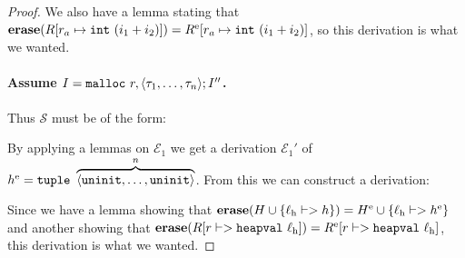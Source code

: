 \begin{proof}
  We also have a lemma stating that
  $\erase(\high R[r_a \mapsto \mathtt{int}\ (i_1 + i_2)]) = \high R^{\mathrm{e}}[r_a
  \mapsto \mathtt{int}\ (i_1 + i_2)]$, so this derivation is what we wanted.

  \paragraph{Assume $\high I = \mathtt{malloc}\ r, \langle \tau_1, \dots, \tau_n \rangle ; \high I''$.}

  Thus $\mathcal{S}$ must be of the form:

  \begin{mathpar}
  \end{mathpar}

  By applying a lemmas on $\mathcal{E}_1$ we get a derivation $\mathcal{E}_1'$
  of
  $\high h^{\mathrm{e}} = \mathtt{tuple}\ \overbrace{\langle \mathtt{uninit}, \dots,
    \mathtt{uninit} \rangle}^n$. From this we can construct a derivation:

  \begin{mathpar}
  \end{mathpar}

  Since we have a lemma showing that
  $\erase(\high H \cup \{\ell_{\mathrm{h}} |-> \high h\}) = \high H^{\mathrm{e}}
  \cup \{\ell_{\mathrm{h}} |-> \high h^{\mathrm{e}}\}$ and another showing that
  $\erase(\high R[r |-> \mathtt{heapval}\ \ell_{\mathrm{h}}]) = \high
  R^{\mathrm{e}}[r |-> \mathtt{heapval}\ \ell_{\mathrm{h}}]$, this derivation is
  what we wanted.
\end{proof}

